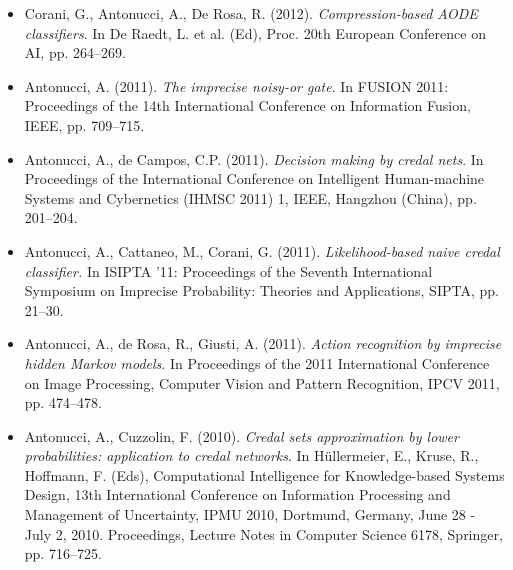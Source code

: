 \documentclass[12pt,a4paper]{moderncv}
\begin{document}
\begin{itemize}
\item Corani, G., Antonucci, A., De Rosa, R. (2012). \textit{Compression-based AODE classifiers}. In De Raedt, L. et al. (Ed), Proc. 20th European Conference on AI, pp. 264--269.
\item Antonucci, A. (2011). \textit{The imprecise noisy-or gate}. In FUSION 2011: Proceedings of the 14th International Conference on Information Fusion, IEEE, pp. 709--715.
\item Antonucci, A., de Campos, C.P. (2011). \textit{Decision making by credal nets}. In Proceedings of the International Conference on Intelligent Human-machine Systems and Cybernetics (IHMSC 2011) 1, IEEE, Hangzhou (China), pp. 201--204.
\item Antonucci, A., Cattaneo, M., Corani, G. (2011). \textit{Likelihood-based naive credal classifier.} In ISIPTA '11: Proceedings of the Seventh International Symposium on Imprecise Probability: Theories and Applications, SIPTA, pp. 21--30.
\item Antonucci, A., de Rosa, R., Giusti, A. (2011). \textit{Action recognition by imprecise hidden Markov models}. In Proceedings of the 2011 International Conference on Image Processing, Computer Vision and Pattern Recognition, IPCV 2011, pp. 474--478.
\item Antonucci, A., Cuzzolin, F. (2010). \textit{Credal sets approximation by lower probabilities: application to credal networks}. In H\"ullermeier, E., Kruse, R., Hoffmann, F. (Eds), Computational Intelligence for Knowledge-based Systems Design, 13th International Conference on Information Processing and Management of Uncertainty, IPMU 2010, Dortmund, Germany, June 28 - July 2, 2010. Proceedings, Lecture Notes in Computer Science 6178, Springer, pp. 716--725.
\end{itemize}
\end{document}
